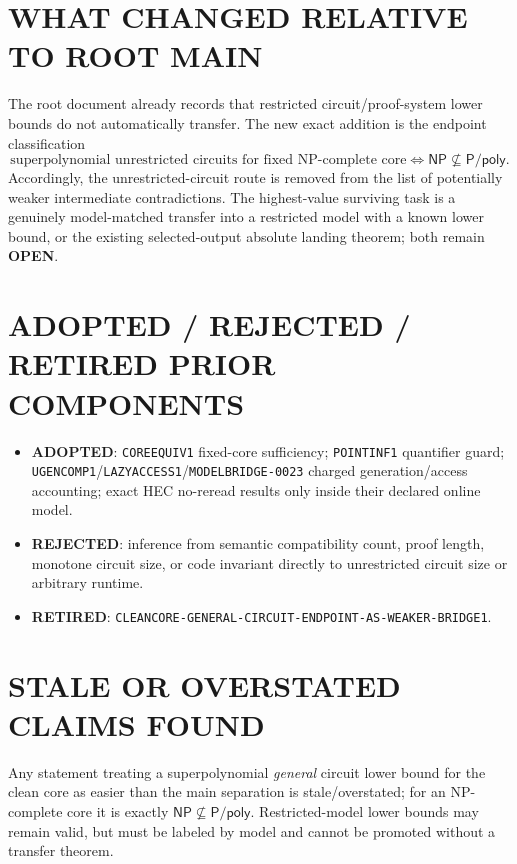 \documentclass[11pt]{article}
\newcommand{\NP}{\mathsf{NP}}
\begin{document}
\section*{WHAT CHANGED RELATIVE TO ROOT MAIN}

The root document already records that restricted circuit/proof-system lower bounds do not automatically transfer.  The new exact addition is the endpoint classification
\[
\text{superpolynomial unrestricted circuits for fixed NP-complete core}
\iff \NP\not\subseteq\mathsf{P/poly}.
\]
Accordingly, the unrestricted-circuit route is removed from the list of potentially weaker intermediate contradictions.  The highest-value surviving task is a genuinely model-matched transfer into a restricted model with a known lower bound, or the existing selected-output absolute landing theorem; both remain \textbf{OPEN}.

\section*{ADOPTED / REJECTED / RETIRED PRIOR COMPONENTS}

\begin{itemize}
  \item \textbf{ADOPTED}: \texttt{COREEQUIV1} fixed-core sufficiency; \texttt{POINTINF1} quantifier guard; \texttt{UGENCOMP1}/\texttt{LAZYACCESS1}/\texttt{MODELBRIDGE-0023} charged generation/access accounting; exact HEC no-reread results only inside their declared online model.
  \item \textbf{REJECTED}: inference from semantic compatibility count, proof length, monotone circuit size, or code invariant directly to unrestricted circuit size or arbitrary runtime.
  \item \textbf{RETIRED}: \texttt{CLEANCORE-GENERAL-CIRCUIT-ENDPOINT-AS-WEAKER-BRIDGE1}.
\end{itemize}

\section*{STALE OR OVERSTATED CLAIMS FOUND}

Any statement treating a superpolynomial \emph{general} circuit lower bound for the clean core as easier than the main separation is stale/overstated; for an NP-complete core it is exactly \(\NP\not\subseteq\mathsf{P/poly}\).  Restricted-model lower bounds may remain valid, but must be labeled by model and cannot be promoted without a transfer theorem.
\end{document}
